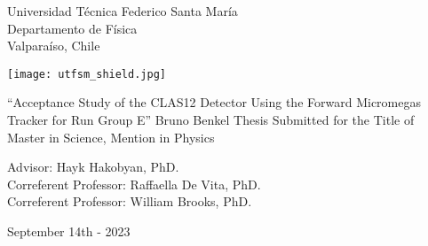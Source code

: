 \begin{titlepage}
\begin{center}
    \noindent
    \fontsize{18pt}{22pt}\selectfont Universidad T\'ecnica Federico Santa Mar\'ia \\
    \fontsize{16pt}{19pt}\selectfont Departamento de F\'isica \\
    \fontsize{16pt}{19pt}\selectfont Valpara\'iso, Chile \\
    \vspace{1.5cm}

    \texttt{[image: utfsm\_shield.jpg]}
    \vspace{1.5cm}

    \fontsize{20pt}{24pt}\selectfont ``Acceptance Study of the CLAS12 Detector Using the Forward Micromegas Tracker for Run Group E''
    \vfill
    \fontsize{16pt}{19pt}\selectfont Bruno Benkel
    \vfill
    \fontsize{16pt}{19pt}\selectfont Thesis Submitted for the Title of \\ Master in Science, Mention in Physics
    \vspace{1.5cm}

    \fontsize{14pt}{17pt}\selectfont Advisor: Hayk Hakobyan, PhD. \\
    \fontsize{14pt}{17pt}\selectfont Correferent Professor: Raffaella De Vita, PhD. \\
    \fontsize{14pt}{17pt}\selectfont Correferent Professor: William Brooks, PhD.
    \vspace{2.5cm}

    \fontsize{14pt}{17pt}\selectfont September 14th - 2023
\end{center}
\end{titlepage}

       \pagebreak
 \pagebreak
         \pagebreak
         \pagebreak
\tableofcontents                         \pagebreak
{} {}
\listoffigures                           \pagebreak
